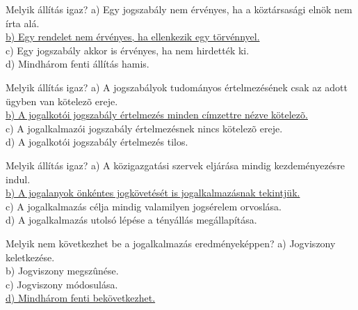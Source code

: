 \begin{frame}

\begin{tcolorbox}[title={29. Kérdés}]
Melyik állítás igaz?
\tcblower
a) Egy jogszabály nem érvényes, ha a köztársasági elnök nem írta alá.\\
\uline {b) Egy rendelet nem érvényes, ha ellenkezik egy törvénnyel.}\\
c) Egy jogszabály akkor is érvényes, ha nem hirdették ki.\\
d) Mindhárom fenti állítás hamis.
\end{tcolorbox}

\begin{tcolorbox}[title={30. Kérdés}]
Melyik állítás igaz?
\tcblower
a) A jogszabályok tudományos értelmezésének csak az adott ügyben van kötelezõ ereje.\\
\uline {b) A jogalkotói jogszabály értelmezés minden címzettre nézve kötelezõ.}\\
c) A jogalkalmazói jogszabály értelmezésnek nincs kötelezõ ereje.\\
d) A jogalkotói jogszabály értelmezés tilos. 
\end{tcolorbox}

\begin{tcolorbox}[title={31. Kérdés}]
Melyik állítás igaz?
\tcblower
a) A közigazgatási szervek eljárása mindig kezdeményezésre indul.\\
\uline {b) A jogalanyok önkéntes jogkövetését is jogalkalmazásnak tekintjük.}\\
c) A jogalkalmazás célja mindig valamilyen jogsérelem orvoslása.\\
d) A jogalkalmazás utolsó lépése a tényállás megállapítása.
\end{tcolorbox}

\begin{tcolorbox}[title={32. Kérdés}]
Melyik nem következhet be a jogalkalmazás eredményeképpen?
\tcblower
a) Jogviszony keletkezése.\\
b) Jogviszony megszûnése.\\
c) Jogviszony módosulása.\\
\uline {d) Mindhárom fenti bekövetkezhet.}
\end{tcolorbox}

\end{frame}


